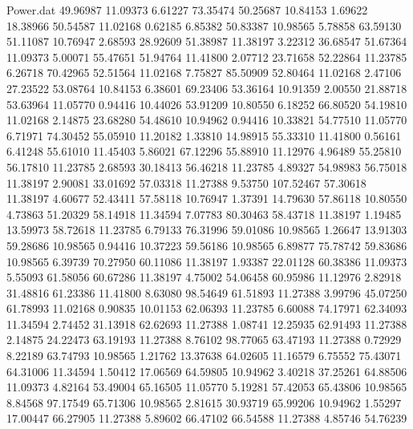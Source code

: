 \begin{filecontents}{Power.dat}
  49.96987   11.09373    6.61227   73.35474
  50.25687   10.84153    1.69622   18.38966
  50.54587   11.02168    0.62185    6.85382
  50.83387   10.98565    5.78858   63.59130
  51.11087   10.76947    2.68593   28.92609
  51.38987   11.38197    3.22312   36.68547
  51.67364   11.09373    5.00071   55.47651
  51.94764   11.41800    2.07712   23.71658
  52.22864   11.23785    6.26718   70.42965
  52.51564   11.02168    7.75827   85.50909
  52.80464   11.02168    2.47106   27.23522
  53.08764   10.84153    6.38601   69.23406
  53.36164   10.91359    2.00550   21.88718
  53.63964   11.05770    0.94416   10.44026
  53.91209   10.80550    6.18252   66.80520
  54.19810   11.02168    2.14875   23.68280
  54.48610   10.94962    0.94416   10.33821
  54.77510   11.05770    6.71971   74.30452
  55.05910   11.20182    1.33810   14.98915
  55.33310   11.41800    0.56161    6.41248
  55.61010   11.45403    5.86021   67.12296
  55.88910   11.12976    4.96489   55.25810
  56.17810   11.23785    2.68593   30.18413
  56.46218   11.23785    4.89327   54.98983
  56.75018   11.38197    2.90081   33.01692
  57.03318   11.27388    9.53750  107.52467
  57.30618   11.38197    4.60677   52.43411
  57.58118   10.76947    1.37391   14.79630
  57.86118   10.80550    4.73863   51.20329
  58.14918   11.34594    7.07783   80.30463
  58.43718   11.38197    1.19485   13.59973
  58.72618   11.23785    6.79133   76.31996
  59.01086   10.98565    1.26647   13.91303
  59.28686   10.98565    0.94416   10.37223
  59.56186   10.98565    6.89877   75.78742
  59.83686   10.98565    6.39739   70.27950
  60.11086   11.38197    1.93387   22.01128
  60.38386   11.09373    5.55093   61.58056
  60.67286   11.38197    4.75002   54.06458
  60.95986   11.12976    2.82918   31.48816
  61.23386   11.41800    8.63080   98.54649
  61.51893   11.27388    3.99796   45.07250
  61.78993   11.02168    0.90835   10.01153
  62.06393   11.23785    6.60088   74.17971
  62.34093   11.34594    2.74452   31.13918
  62.62693   11.27388    1.08741   12.25935
  62.91493   11.27388    2.14875   24.22473
  63.19193   11.27388    8.76102   98.77065
  63.47193   11.27388    0.72929    8.22189
  63.74793   10.98565    1.21762   13.37638
  64.02605   11.16579    6.75552   75.43071
  64.31006   11.34594    1.50412   17.06569
  64.59805   10.94962    3.40218   37.25261
  64.88506   11.09373    4.82164   53.49004
  65.16505   11.05770    5.19281   57.42053
  65.43806   10.98565    8.84568   97.17549
  65.71306   10.98565    2.81615   30.93719
  65.99206   10.94962    1.55297   17.00447
  66.27905   11.27388    5.89602   66.47102
  66.54588   11.27388    4.85746   54.76239

\end{filecontents}
